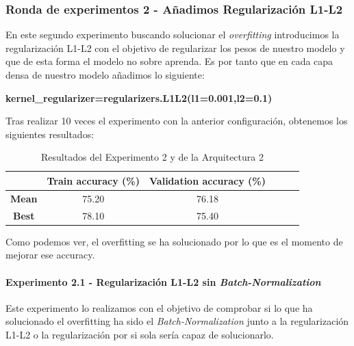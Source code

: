 \documentclass{article}
\begin{document}
      \subsubsection{Ronda de experimentos 2 - A\~{n}adimos Regularizaci\'on L1-L2}
		\label{j-s-a0-e2} %
			En este segundo experimento buscando solucionar el \textit{overfitting} introducimos la regularizaci\'on L1-L2 con el objetivo de regularizar los pesos de nuestro modelo y que de esta forma el modelo no sobre aprenda.
            Es por tanto que en cada capa densa de nuestro modelo a\~{n}adimos lo siguiente:
            
            \textbf{kernel\_regularizer=regularizers.L1L2(l1=0.001,l2=0.1)}
			
			
			Tras realizar 10 veces el experimento con la anterior configuraci\'on, obtenemos los siguientes resultados:
			\begin{table}[!h]
				\begin{center}
					\begin{tabular}{ c | c | c | c | c | c |}
						\ & \textbf{Train accuracy (\%)} & \textbf{Validation accuracy (\%)}  \\ \hline
						\textbf{Mean} & 75.20 & 76.18 \\ \hline
						\textbf{Best} & 78.10 & 75.40 \\ \hline
					\end{tabular}
					\caption{Resultados del Experimento 2 y de la Arquitectura 2}
					\label{tab:res-j-a0-e1}
				\end{center}
			\end{table}
		    
		    Como podemos ver, el overfitting se ha solucionado por lo que es el momento de mejorar ese accuracy.
      
      	\paragraph{Experimento 2.1 - Regularizaci\'on L1-L2 sin \textit{Batch-Normalization}}
		\label{j-s-a0-e2.1} %
			Este experimento lo realizamos con el objetivo de comprobar si lo que ha solucionado el overfitting ha sido el \textit{Batch-Normalization} junto a la regularizaci\'on L1-L2 o la regularizaci\'on por si sola ser\'ia capaz de solucionarlo.
			
\end{document}
